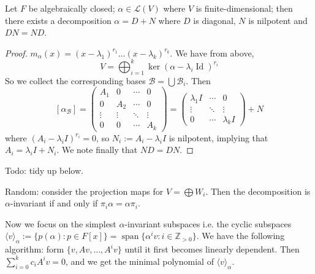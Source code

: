 \documentclass{scrartcl}
\def\Z{\mathbb{Z}}
\def\L{\mathcal{L}}
\def\B{\mathcal{B}}
\DeclareMathOperator{\id}{Id}
\DeclareMathOperator{\spn}{span}  %
\begin{document}
\begin{corollary}
	Let $F$ be algebraically closed; $\alpha \in \L(V)$ where $V$ is finite-dimensional; then there exists a decomposition $\alpha = D+N$ where $D$ is diagonal, $N$ is nilpotent and $DN = ND$. 
\end{corollary}
\begin{proof}
	$m_\alpha(x) = (x-\lambda_1)^{r_1} \dots (x-\lambda_k)^{r_k}$. We have from above, 
	\[V = \bigoplus_{i=1}^k \ker(\alpha-\lambda_i\id)^{r_i}\] 
	So we collect the corresponding bases $\B = \bigcup \B_i$. Then
	\[[\alpha_\B]=\begin{pmatrix}
		A_1 & 0 & \cdots & 0 \\
		0 & A_2 & \cdots & 0 \\
		\vdots & \vdots & \ddots & \vdots \\
		0 & 0 & \cdots & A_k
	\end{pmatrix} = \begin{pmatrix}
		\lambda_1 I & \cdots & 0 \\
		\vdots & \ddots & \vdots \\
		0 & \cdots & \lambda_k I
	\end{pmatrix} + N\]
	where $(A_i-\lambda_i I)^{r_i}=0$, so $N_i := A_i-\lambda_i I$ is nilpotent, implying that $A_i = \lambda_i I + N_i$. We note finally that $ND = DN$.
\end{proof}
Todo: tidy up below. 
\par Random: consider the projection maps for $V = \bigoplus W_i$. Then the decomposition is $\alpha$-invariant if and only if $\pi_i\alpha = \alpha \pi_i$.
\par Now we focus on the simplest $\alpha$-invariant subspaces i.e. the cyclic subspaces $\langle v \rangle_\alpha := \{p(\alpha): p \in F[x]\} = \spn\{\alpha^iv: i \in \Z_{>0}\}$. We have the following algorithm: form $\{v, Av, \dots, A^iv\}$ until it first becomes linearly dependent. Then $\sum_{i=0}^kc_iA^iv = 0$, and we get the minimal polynomial of $\langle v \rangle_\alpha$.
\end{document}
